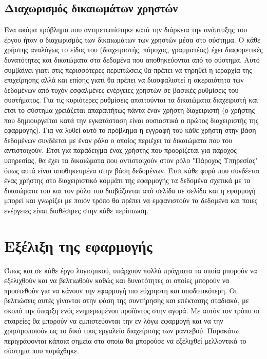 \subsection{Διαχωρισμός δικαιωμάτων χρηστών}
Ένα ακόμα πρόβλημα που αντιμετωπίστηκε κατά την διάρκεια την ανάπτυξης του έργου ήταν ο διαχωρισμός των δικαιωμάτων των χρηστών μέσα στο σύστημα. Ο κάθε χρήστης αναλόγως το είδος του (διαχειριστής, πάροχος, γραμματέας) έχει διαφορετικές δυνατότητες και δικαιώματα στα δεδομένα που αποθηκεύονται από το σύστημα. Αυτό συμβαίνει γιατί στις περισσότερες περιπτώσεις θα πρέπει να τηρηθεί η ιεραρχία της επιχείρησης αλλά και επίσης γιατί θα πρέπει να διασφαλιστεί η ακεραιότητα των δεδομένων από τυχόν εσφαλμένες ενέργειες χρηστών σε βασικές ρυθμίσεις του συστήματος. Για τις κυριότερες ρυθμίσεις απαιτούνται τα δικαιώματα διαχειριστή και έτσι το σύστημα χρειάζεται απαραιτήτως πάντα έναν χρήστη διαχειριστή (ο χρήστης που δημιουργείται κατά την εγκατάσταση είναι ουσιαστικά ο πρώτος διαχειριστής της εφαρμογής). Για να λυθεί αυτό το πρόβλημα η εγγραφή του κάθε χρήστη στην βάση δεδομένων συνδέεται με έναν ρόλο ο οποίος περιέχει τα δικαιώματα που του αντιστοιχούν. Έτσι για παράδειγμα ένας χρήστης που προορίζεται για πάροχος υπηρεσίας, θα έχει τα δικαιώματα που αντιστοιχούν στον ρόλο "Πάροχος Υπηρεσίας" όπως αυτά είναι αποθηκευμένα στην βάση δεδομένων. Έτσι κάθε φορά που συνδέεται ένας χρήστης στο διαχειριστικό κομμάτι της εφαρμογής τα δεδομένα σχετικά με τα δικαιώματα του και τον ρόλο του διαβάζονται από σελίδα σε σελίδα και η εφαρμογή μπορεί και γνωρίζει με ποιόν τρόπο θα πρέπει να εμφανιστούν τα δεδομένα και ποιες ενέργειες είναι διαθέσιμες στην κάθε περίπτωση.

\section{Εξέλιξη της εφαρμογής}
Όπως και σε κάθε έργο λογισμικού, υπάρχουν πολλά πράγματα τα οποία μπορούν να εξελιχθούν και να βελτιωθούν καθώς και δυνατότητες οι οποίες μπορούν να προστεθούν για να κάνουν την εφαρμογή πιο εύχρηστη και αποδοτικότερη. Οι βελτιώσεις αυτές γίνονται στην φάση της συντήρησης και επέκτασης σταδιακά, με σκοπό την ύπαρξη ενός ενημερωμένου προϊόντος στην αγορά. Με αυτόν τον τρόπο οι εταιρείες θα μπορούν να εμπιστεύονται την εν λόγω εφαρμογή και να την χρησιμοποιούν ως το δικό τους εργαλείο διαχείρισης των ραντεβού. Παρακάτω περιγράφονται κάποια σημεία στα οποία θα μπορούσε να εξελιχθεί μελλοντικά το σύστημα που παράχθηκε.

